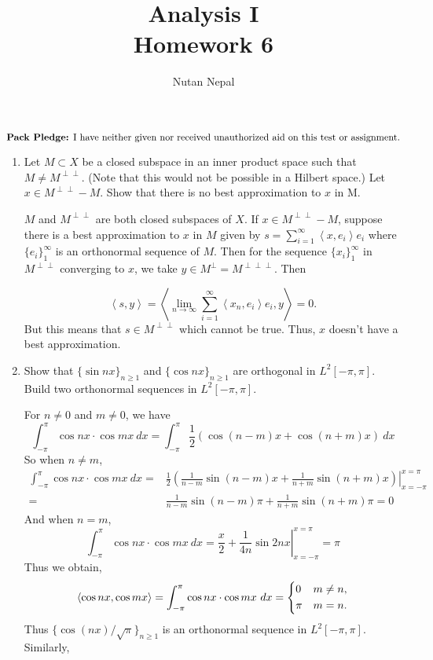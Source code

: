 \documentclass[12pt]{article}
\title{Analysis I \\
\large Homework 6
}
\author{Nutan Nepal}
\newcommand{\inn}[2]{\left\langle #1, #2 \right\rangle}
\newcommand{\packpledge}{
    $\text{{\bf Pack Pledge:} I have neither given nor
    received unauthorized aid on this
    test or assignment.}$}
\begin{document}
\maketitle
\packpledge\\
\makebox[\linewidth]{\rule{200mm}{1pt}}
\vspace{1mm}

\begin{enumerate}

\item Let $M \subset X$ be a  closed subspace in an inner
product space such that $M  \neq M^{\perp \perp}$.
(Note that this would not be possible in a
Hilbert space.) Let $x \in 
M^{\perp \perp} - M$. Show that there is no best
approximation to $x$ in M.

\begin{mybox}

    $M$ and $M^{\perp\perp}$ are both closed subspaces of
    $X$. If $x \in M^{\perp \perp} - M$,
    suppose there is a best approximation to $x$ in $M$
    given by $s=\sum_{i=1}^\infty{\inn{x}{e_i}e_i}$ where
    $\{e_i\}_1^\infty$ is an orthonormal sequence of $M$.
    Then for the sequence $\{x_i\}_1^\infty$
    in $M^{\perp\perp}$ converging to $x$, we take $y\in
    M^\perp=M^{\perp\perp\perp}$. Then

    $${\inn{s}{y}}=\inn{\lim_{n\to \infty}{\sum_{i=1}
    ^\infty{\inn{x_n}{e_i}e_i}}}{y}=0.$$
    But this means that $s\in M^{\perp\perp}$ which cannot
    be true. Thus, $x$ doesn't have a best approximation.
    
\end{mybox}

\item Show that $\{\sin nx\}_{n \geq 1}$ and
$\{\cos nx\}_{n \geq 1}$ are orthogonal in
$L^2[-\pi,\pi]$. Build two orthonormal sequences in
$L^2[-\pi,\pi]$.
\begin{mybox}

    For $n\neq 0$ and $m\neq 0$, we have
    $$
    \int_{-\pi}^{\pi}{\cos nx \cdot\cos mx\ dx}=
    \int_{-\pi}^{\pi}{\frac{1}{2}(\cos (n-m)x+
    \cos (n+m)x)\ dx}$$
    So when $n\neq m$,
    \begin{align*}
    \int_{-\pi}^{\pi}{\cos nx \cdot\cos mx\ dx}=&
    \left. \frac{1}{2}(\frac{1}{n-m}\sin (n-m)x+
    \frac{1}{n+m}\sin (n+m)x)\right|_{x=-\pi}^{x=\pi}\\
    =&\frac{1}{n-m}\sin (n-m)\pi+
    \frac{1}{n+m}\sin (n+m)\pi=0
    \end{align*}
    And when $n=m$,
    $$\int_{-\pi}^{\pi}{\cos nx \cdot\cos mx\ dx}=
    \left. \frac{x}{2}+
    \frac{1}{4n}\sin 2nx\right|_{x=-\pi}^{x=\pi}=\pi$$
    Thus we obtain,
    $$\inn{\cos nx}{\cos mx}=\int_{-\pi}^{\pi}{
        \cos nx \cdot\cos mx\ dx
    }=\begin{dcases}
        0 & m\neq n,\\
        \pi & m=n.
    \end{dcases}$$
    Thus $\{\cos (nx)/\sqrt{\pi}\}_{n\geq 1}$ is an
    orthonormal sequence in $L^2[-\pi,\pi]$. Similarly,


\end{mybox}
\end{enumerate}
\end{document}
